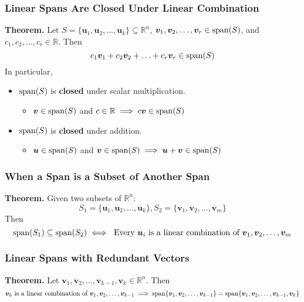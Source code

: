 \documentclass[../ma2001_notes.tex]{subfiles}
\begin{document}
\subsubsection{Linear Spans Are Closed Under Linear Combination}
\textbf{Theorem.} Let \(S=\{\bm{u}_1,\bm{u}_2,\ldots,\bm{u}_k\}\subseteq\mathbb{R}^n\), \(\bm{v}_1,\bm{v}_2,\ldots,\bm{v}_r\in\operatorname{span}(S)\), and \(c_1,c_2,\ldots,c_r\in\mathbb{R}\). Then
\[c_1\bm{v}_1+c_2\bm{v}_2+\ldots+c_r\bm{v}_r\in\operatorname{span}(S)\]
In particular,
\begin{itemize}
	\item\(\operatorname{span}(S)\) is \textbf{closed} under scalar multiplication.
	\begin{itemize}
		\item\(\bm{v}\in\operatorname{span}(S)\) and \(c\in\mathbb{R}\implies c\bm{v}\in\operatorname{span}(S)\)
	\end{itemize}
	\item\(\operatorname{span}(S)\) is \textbf{closed} under addition.
	\begin{itemize}
		\item\(\bm{u}\in\operatorname{span}(S)\) and \(\bm{v}\in\operatorname{span}(S)\implies\bm{u}+\bm{v}\in\operatorname{span}(S)\)
	\end{itemize}
\end{itemize}

\subsubsection{When a Span is a Subset of Another Span}
\textbf{Theorem.} Given two subsets of \(\mathbb{R}^n\):
\[S_1=\{\bm{u}_1,\bm{u}_2,\ldots,\bm{u}_k\},S_2=\{\bm{v}_1,\bm{v}_2,\ldots,\bm{v}_m\}\]
Then
\[\operatorname{span}(S_1)\subseteq\operatorname{span}(S_2)\iff\text{ Every }\bm{u}_i\text{ is a linear combination of }\bm{v}_1,\bm{v}_2,\ldots,\bm{v}_m\]

\subsubsection{Linear Spans with Redundant Vectors}
\textbf{Theorem.} Let \(\bm{v}_1,\bm{v}_2,\ldots,\bm{v}_{k-1},\bm{v}_k\in\mathbb{R}^n\). Then
\[\bm{v}_k\text{ is a linear combination of }\bm{v}_1,\bm{v}_2,\ldots,\bm{v}_{k-1}\implies\operatorname{span}\{\bm{v}_1,\bm{v}_2,\ldots,\bm{v}_{k-1}\}=\operatorname{span}\{\bm{v}_1,\bm{v}_2,\ldots,\bm{v}_{k-1},\bm{v}_k\}\]
\end{document}
